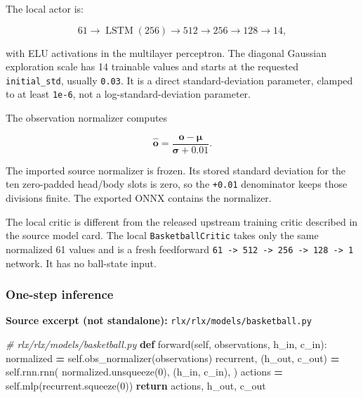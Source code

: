 \documentclass[
  american,
  11pt,
  letterpaper,
]{article}
\newenvironment{Shaded}{\begin{snugshade}}{\end{snugshade}}
\newcommand{\CommentTok}[1]{\textcolor[rgb]{0.56,0.35,0.01}{\textit{#1}}}
\newcommand{\ControlFlowTok}[1]{\textcolor[rgb]{0.13,0.29,0.53}{\textbf{#1}}}
\newcommand{\DecValTok}[1]{\textcolor[rgb]{0.00,0.00,0.81}{#1}}
\newcommand{\KeywordTok}[1]{\textcolor[rgb]{0.13,0.29,0.53}{\textbf{#1}}}
\newcommand{\NormalTok}[1]{#1}
\newcommand{\OperatorTok}[1]{\textcolor[rgb]{0.81,0.36,0.00}{\textbf{#1}}}
\newcommand{\VariableTok}[1]{\textcolor[rgb]{0.00,0.00,0.00}{#1}}
\renewenvironment{Shaded}{\par\smallskip}{\par\smallskip}
\begin{document}
The local actor is:

\[
61
\rightarrow \operatorname{LSTM}(256)
\rightarrow 512
\rightarrow 256
\rightarrow 128
\rightarrow 14,
\]

with ELU activations in the multilayer perceptron. The diagonal Gaussian
exploration scale has 14 trainable values and starts at the requested
\texttt{initial\_std}, usually \texttt{0.03}. It is a direct
standard-deviation parameter, clamped to at least \texttt{1e-6}, not a
log-standard-deviation parameter.

The observation normalizer computes

\[
\widehat{\mathbf o}
=\frac{\mathbf o-\boldsymbol\mu}
{\boldsymbol\sigma+0.01}.
\]

The imported source normalizer is frozen. Its stored standard deviation
for the ten zero-padded head/body slots is zero, so the \texttt{+0.01}
denominator keeps those divisions finite. The exported ONNX contains the
normalizer.

The local critic is different from the released upstream training critic
described in the source model card. The local
\texttt{Basketba\allowbreak{}llCritic\allowbreak{}} takes only the same
normalized 61 values and is a fresh feedforward
\texttt{61\ -\textgreater{}\ 512\ -\textgreater{}\ 256\ -\textgreater{}\ 128\ -\textgreater{}\ 1}
network. It has no ball-state input.

\subsubsection{One-step inference}\label{one-step-inference}

\textbf{Source excerpt (not standalone):}
\texttt{rlx/\allowbreak{}rlx/\allowbreak{}models/\allowbreak{}basketba\allowbreak{}ll.py}

\begin{Shaded}
\begin{Highlighting}[]
\CommentTok{\# rlx/rlx/models/basketball.py}
\KeywordTok{def}\NormalTok{ forward(}\VariableTok{self}\NormalTok{, observations, h\_in, c\_in):}
\NormalTok{    normalized }\OperatorTok{=} \VariableTok{self}\NormalTok{.obs\_normalizer(observations)}
\NormalTok{    recurrent, (h\_out, c\_out) }\OperatorTok{=} \VariableTok{self}\NormalTok{.rnn.rnn(}
\NormalTok{        normalized.unsqueeze(}\DecValTok{0}\NormalTok{),}
\NormalTok{        (h\_in, c\_in),}
\NormalTok{    )}
\NormalTok{    actions }\OperatorTok{=} \VariableTok{self}\NormalTok{.mlp(recurrent.squeeze(}\DecValTok{0}\NormalTok{))}
    \ControlFlowTok{return}\NormalTok{ actions, h\_out, c\_out}
\end{Highlighting}
\end{Shaded}
\end{document}
